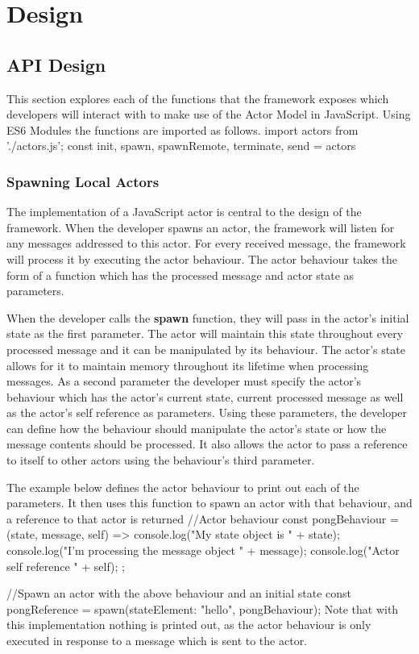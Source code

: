 \documentclass[12pt, a4paper]{report}
\newenvironment{code}
{\footnotesize\verbatim}{\endverbatim\normalfont}
\theoremstyle{definition}
\theoremstyle{definition}%
\theoremstyle{definition}%
\theoremstyle{definition}%
\theoremstyle{definition}%
\theoremstyle{definition}%
\begin{document}
\chapter{Design}
\section{API Design}
This section explores each of the functions that the framework exposes which developers will interact with to make use of the Actor Model in JavaScript. Using ES6 Modules the functions are imported as follows.
\begin{code}
import actors from './actors.js';
const { init, spawn, spawnRemote, terminate, send} = actors
\end{code}
\subsection{Spawning Local Actors}
The implementation of a JavaScript actor is central to the design of the framework. When the developer spawns an actor, the framework will listen for any messages addressed to this actor. For every received message, the framework will process it by executing the actor behaviour. The actor behaviour takes the form of a function which has the processed message and actor state as parameters.

When the developer calls the \textbf{spawn} function, they will pass in the actor's initial state as the first parameter. The actor will maintain this state throughout every processed message and it can be manipulated by its behaviour. The actor's state allows for it to maintain memory throughout its lifetime when processing messages. As a second parameter the developer must specify the actor's behaviour which has the actor's current state, current processed message as well as the actor's self reference as parameters. Using these parameters, the developer can define how the behaviour should manipulate the actor's state or how the message contents should be processed. It also allows the actor to pass a reference to itself to other actors using the behaviour's third parameter.

The example below defines the actor behaviour to print out each of the parameters. It then uses this function to spawn an actor with that behaviour, and a reference to that actor is returned
\begin{code}
//Actor behaviour
const pongBehaviour = (state, message, self) => {
    console.log("My state object is " + state);
    console.log("I'm processing the message object " + message);
    console.log("Actor self reference " + self);
};

//Spawn an actor with the above behaviour and an initial state
const pongReference = spawn({stateElement: "hello"}, pongBehaviour);
\end{code}
Note that with this implementation nothing is printed out, as the actor behaviour is only executed in response to a message which is sent to the actor.
\end{document}

